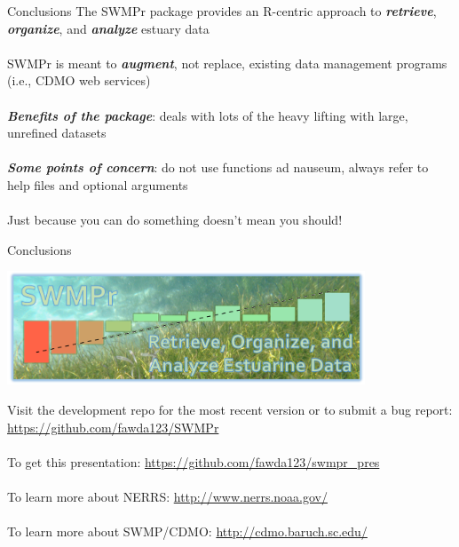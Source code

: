 \documentclass[serif]{beamer}\usepackage[]{graphicx}\usepackage[]{color}
\newcommand{\Bigtxt}[1]{\textbf{\textit{#1}}}
\begin{document}
\begin{frame}{Conclusions}
The SWMPr package provides an R-centric approach to \Bigtxt{retrieve}, \Bigtxt{organize}, and \Bigtxt{analyze} estuary data \\~\\
SWMPr is meant to \Bigtxt{augment}, not replace, existing data management programs (i.e., CDMO web services) \\~\\
\Bigtxt{Benefits of the package}: deals with lots of the heavy lifting with large, unrefined datasets \\~\\
\Bigtxt{Some points of concern}: do not use functions ad nauseum, always refer to help files and optional arguments\\~\\
Just because you can do something doesn't mean you should!
\end{frame}

\begin{frame}{Conclusions}
\centerline{\includegraphics[width = 0.8\textwidth]{fig/swmpr_logo.png}}
\vspace{0.15in}
Visit the development repo for the most recent version or to submit a bug report: \href{https://github.com/fawda123/SWMPr}{https://github.com/fawda123/SWMPr}\\~\\
To get this presentation: \href{https://github.com/fawda123/swmpr_pres}{https://github.com/fawda123/swmpr\_pres} \\~\\
To learn more about NERRS: \href{http://www.nerrs.noaa.gov/}{http://www.nerrs.noaa.gov/} \\~\\
To learn more about SWMP/CDMO: \href{http://cdmo.baruch.sc.edu/}{http://cdmo.baruch.sc.edu/}
\end{frame}
\end{document}
